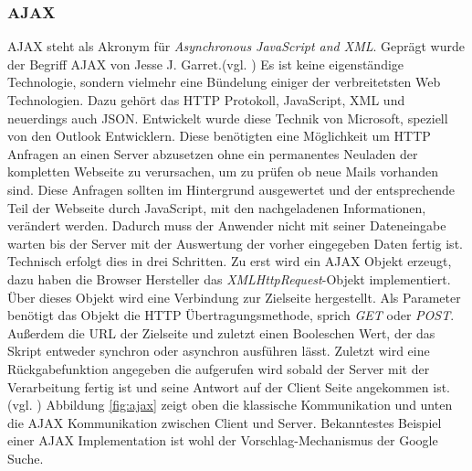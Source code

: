 \subsubsection{AJAX}
AJAX steht als Akronym für \textit{Asynchronous JavaScript and XML}. Geprägt wurde der Begriff AJAX von Jesse J. Garret.(vgl. \cite{JesseJGarret}) Es ist keine eigenständige Technologie, sondern vielmehr eine Bündelung einiger der verbreitetsten Web Technologien. Dazu gehört das HTTP Protokoll, JavaScript, XML und neuerdings auch JSON. Entwickelt wurde diese Technik von Microsoft, speziell von den Outlook Entwicklern. Diese benötigten eine Möglichkeit um HTTP Anfragen an einen Server abzusetzen ohne ein permanentes Neuladen der kompletten Webseite zu verursachen, um zu prüfen ob neue Mails vorhanden sind. Diese Anfragen sollten im Hintergrund ausgewertet und der entsprechende Teil der Webseite durch JavaScript, mit den nachgeladenen Informationen, verändert werden. Dadurch muss der Anwender nicht mit seiner Dateneingabe warten bis der Server mit der Auswertung der vorher eingegeben Daten fertig ist.\\Technisch erfolgt dies in drei Schritten. Zu erst wird ein AJAX Objekt erzeugt, dazu haben die Browser Hersteller das \textit{XMLHttpRequest}-Objekt implementiert. Über dieses Objekt wird eine Verbindung zur Zielseite hergestellt. Als Parameter benötigt das Objekt die HTTP Übertragungsmethode, sprich \textit{GET} oder \textit{POST}. Außerdem die URL der Zielseite und zuletzt einen Booleschen Wert, der das Skript entweder synchron oder asynchron ausführen lässt. Zuletzt wird eine Rückgabefunktion angegeben die aufgerufen wird sobald der Server mit der Verarbeitung fertig ist und seine Antwort auf der Client Seite angekommen ist.(vgl. \cite[S.392ff]{WenzJava2008}) Abbildung \ref{fig:ajax} zeigt oben die klassische Kommunikation und unten die AJAX Kommunikation zwischen Client und Server. Bekanntestes Beispiel einer AJAX Implementation ist wohl der Vorschlag-Mechanismus der Google Suche.

